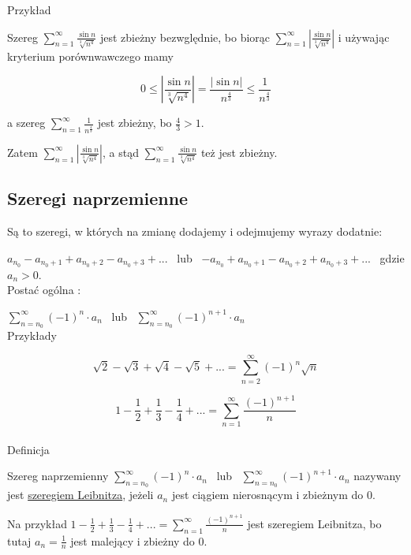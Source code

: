 Przykład 

Szereg $ \sum\limits_{n=1}^{\infty} \frac{\sin n}{\sqrt[3]{n^4}} $ jest zbieżny bezwględnie, bo biorąc
$ \sum\limits_{n=1}^{\infty} \left| \frac{\sin n}{\sqrt[3]{n^4}} \right| $ i używając kryterium porównwawczego mamy

$$ 0 \leq \left| \frac{\sin n}{\sqrt[3]{n^4}} \right| = \frac{|\sin n|}{n^{\frac{4}{3}}} \leq \frac{1}{n^{\frac{4}{3}}} $$

a szereg $ \sum\limits_{n=1}^{\infty} \frac{1}{n^{\frac{4}{3}}} $ jest zbieżny, bo $ \frac{4}{3} > 1 $. 

Zatem
$ \sum\limits_{n=1}^{\infty} \left| \frac{\sin n}{\sqrt[3]{n^4}} \right| $, a stąd
$\sum\limits_{n=1}^{\infty} \frac{\sin n}{\sqrt[3]{n^4}}$ też jest zbieżny.


\subsection*{Szeregi naprzemienne}

Są to szeregi, w których na zmianę dodajemy i odejmujemy wyrazy dodatnie:

$ a_{n_0} - a_{n_0 + 1} + a_{n_0 + 2} - a_{n_0 + 3} + ... $ \ lub \ $ -a_{n_0} + a_{n_0 + 1} - a_{n_0 + 2} + a_{n_0 + 3} + ...  $ \
gdzie $a_n > 0$. \\

Postać ogólna :

$ \sum\limits_{n = n_0}^{\infty} (-1)^n \cdot a_n $ \ lub \ $ \sum\limits_{n = n_0}^{\infty} (-1)^{n+1} \cdot a_n $ \\

Przykłady

$$ \sqrt{2} - \sqrt{3} + \sqrt{4} - \sqrt{5} + ... = \sum\limits_{n=2}^{\infty} (-1)^n \sqrt{n} $$

$$ 1 - \frac{1}{2} + \frac{1}{3} - \frac{1}{4} + ... = \sum\limits_{n=1}^{\infty} \frac{(-1)^{n+1}}{n} $$ \\

Definicja

Szereg naprzemienny $ \sum\limits_{n = n_0}^{\infty} (-1)^n \cdot a_n $ \ lub \ $ \sum\limits_{n = n_0}^{\infty} (-1)^{n+1} \cdot a_n $
nazywany jest \underline{szeregiem Leibnitza}, jeżeli $a_n$ jest ciągiem nierosnącym i zbieżnym do 0.

Na przykład $ 1 - \frac{1}{2} + \frac{1}{3} - \frac{1}{4} + ... = \sum\limits_{n=1}^{\infty} \frac{(-1)^{n+1}}{n} $
jest szeregiem Leibnitza, bo tutaj $ a_n = \frac{1}{n} $ jest malejący i zbieżny do 0. \\

